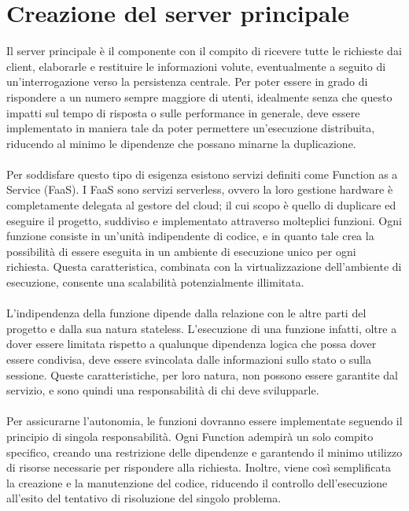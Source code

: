 \section{Creazione del server principale}

Il server principale è il componente con il compito 
di ricevere tutte le richieste dai client,
elaborarle e restituire le informazioni volute,
eventualmente a seguito di un'interrogazione verso la persistenza centrale.
Per poter essere in grado di rispondere a un numero sempre maggiore di utenti,
idealmente senza che questo impatti sul tempo di risposta o sulle performance in generale,
deve essere implementato in maniera tale da poter permettere un'esecuzione distribuita,
riducendo al minimo le dipendenze che possano minarne la duplicazione.\\
\\
Per soddisfare questo tipo di esigenza
esistono servizi definiti come Function as a Service (FaaS).
I FaaS sono servizi serverless,
ovvero la loro gestione hardware è completamente delegata al gestore del cloud;
il cui scopo è quello di duplicare ed eseguire il progetto,
suddiviso e implementato attraverso molteplici funzioni.
Ogni funzione consiste in un'unità indipendente di codice,
e in quanto tale crea la possibilità di essere eseguita 
in un ambiente di esecuzione unico per ogni richiesta.
Questa caratteristica, 
combinata con la virtualizzazione dell'ambiente di esecuzione,
consente una scalabilità potenzialmente illimitata.\\
\\
L'indipendenza della funzione dipende dalla relazione 
con le altre parti del progetto e dalla sua natura stateless.
L'esecuzione di una funzione infatti,
oltre a dover essere limitata rispetto a qualunque dipendenza logica che possa dover essere condivisa,
deve essere svincolata dalle informazioni sullo stato o sulla sessione.
Queste caratteristiche, per loro natura, 
non possono essere garantite dal servizio,
e sono quindi una responsabilità di chi deve svilupparle.\\
\\
Per assicurarne l'autonomia,
le funzioni dovranno essere implementate seguendo il principio di singola responsabilità.
Ogni Function adempirà un solo compito specifico,
creando una restrizione delle dipendenze e
garantendo il minimo utilizzo di risorse necessarie per rispondere alla richiesta.
Inoltre, viene così semplificata la creazione e la manutenzione del codice,
riducendo il controllo dell'esecuzione all'esito del tentativo di risoluzione del singolo problema.
\clearpage
